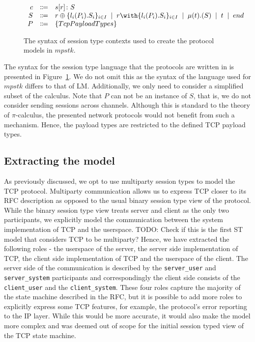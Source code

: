 \documentclass{article}
\newcommand{\todo}[1]{}
\renewcommand{\todo}[1]{{\color{red} TODO: {#1}}}
\newcommand{\type}[1]{\texttt{#1}}
\newcommand{\sep}{\;\mid\;}
\newcommand{\serveruser}{\type{server\_user}}
\newcommand{\serversystem}{\type{server\_system}}
\newcommand{\clientuser}{\type{client\_user}}
\newcommand{\clientsystem}{\type{client\_system}}
\begin{document}
\begin{figure}[H]
    \centering
        $
        \begin{array}{rcl}
        \ensuremath{c}
            & \Coloneqq & \ensuremath{s[r] \colon S} \cr
        \ensuremath{S}
            & \Coloneqq & \ensuremath{r \oplus \{l_i(P_i).S_i\}_{i \in I}}
            \sep        \ensuremath{r \with \{l_i(P_i).S_i\}_{i \in I}}
            \sep        \ensuremath{\mu(t).(S)}
            \sep        \ensuremath{t}
            \sep        \ensuremath{end} \cr
        \ensuremath{P}
            & \Coloneqq & \ensuremath{\{TcpPayloadTypes\}}
        \end{array}
        $
    \caption{The syntax of session type contexts used to create the protocol models in \ensuremath{mpstk}.}
    \label{fig:syntax}
\end{figure}

The syntax for the session type language that the protocols are written in is presented in Figure~\ref{fig:syntax}.
We do not omit this as the syntax of the language used for \ensuremath{mpstk} differs to that of LM.
Additionally, we only need to consider a simplified subset of the calculus.
Note that \ensuremath{P} can not be an instance of \ensuremath{S}, that is, we do not consider sending sessions across channels.
Although this is standard to the theory of \ensuremath{\pi}-calculus, the presented network protocols would not benefit from such a mechanism.
Hence, the payload types are restricted to the defined TCP payload types.

\subsection{Extracting the model}

As previously discussed, we opt to use multiparty session types to model the TCP protocol.
Multiparty communication allows us to express TCP closer to its RFC description as opposed to the usual binary session type view of the protocol.
While the binary session type view treats server and client as the only two participants, we explicitly model the communication between the system implementation of TCP and the userspace.
\todo{Check if this is the first ST model that considers TCP to be multiparty?}
Hence, we have extracted the following roles - the userspace of the server, the server side implementation of TCP, the client side implementation of TCP and the userspace of the client.
The server side of the communication is described by the {\serveruser} and {\serversystem} participants and correspondingly the client side  consists of the {\clientuser} and the {\clientsystem}.
These four roles capture the majority of the state machine described in the RFC, but it is possible to add more roles to explicitly express some TCP features, for example, the protocol's error reporting to the IP layer.
While this would be more accurate, it would also make the model more complex and was deemed out of scope for the initial session typed view of the TCP state machine.
\end{document}
